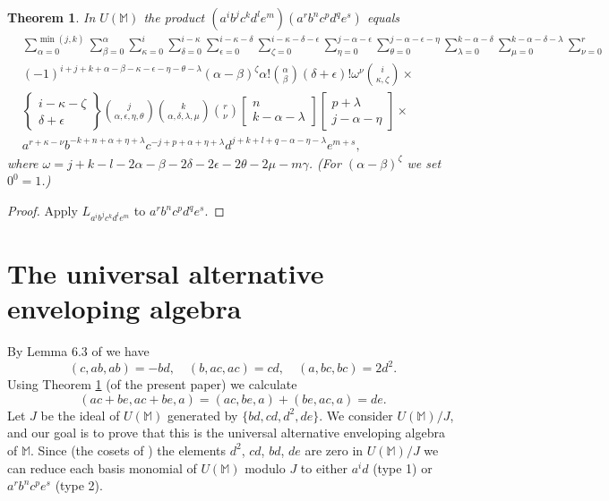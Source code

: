\documentclass{amsart}
\theoremstyle{plain}
\newtheorem{theorem}[lemma]{Theorem}
\theoremstyle{definition}
\begin{document}
\begin{theorem} \label{structureconstants}
In $U(\mathbb{M})$ the product $( a^i b^j c^k d^l e^m) ( a^r b^n c^p d^q e^s)$
equals
  \allowdisplaybreaks
  \begin{align*}
  &
  \sum_{\alpha=0}^{\min(j,k)}
  \sum_{\beta=0}^{\alpha}
  \sum_{\kappa=0}^{i}
  \sum_{\delta=0}^{i-\kappa}
  \sum_{\epsilon=0}^{i-\kappa-\delta}
  \sum_{\zeta=0}^{i{-}\kappa{-}\delta{-}\epsilon}
  \sum_{\eta=0}^{j-\alpha-\epsilon}
  \sum_{\theta=0}^{j-\alpha-\epsilon-\eta}
  \sum_{\lambda=0}^{k-\alpha-\delta}
  \sum_{\mu=0}^{k-\alpha-\delta-\lambda}
  \sum_{\nu=0}^r
  \\
  &
  (-1)^{i+j+k+\alpha-\beta-\kappa-\epsilon-\eta-\theta-\lambda}
  (\alpha{-}\beta)^\zeta
  \alpha!
  \binom{\alpha}{\beta}
  (\delta{+}\epsilon)!
  \omega^\nu
  \binom{i}{\kappa,\zeta}
  \times
  \\
  &
  \left\{ \begin{matrix}
  i{-}\kappa{-}\zeta \\ \delta{+}\epsilon
  \end{matrix} \right\}
  \binom{j}{\alpha,\epsilon,\eta,\theta}
  \binom{k}{\alpha,\delta,\lambda,\mu}
  \binom{r}{\nu}
  \left[
  \begin{matrix}
  n \\
  k{-}\alpha{-}\lambda
  \end{matrix}
  \right]
  \left[
  \begin{matrix}
  p{+}\lambda \\
  j{-}\alpha{-}\eta
  \end{matrix}
  \right]
  \times
  \\
  &
  a^{r+\kappa-\nu}
  b^{-k+n+\alpha+\eta+\lambda}
  c^{-j+p+\alpha+\eta+\lambda}
  d^{j+k+l+q-\alpha-\eta-\lambda} e^{m+s},
  \end{align*}
where $\omega = j {+} k {-} l {-} 2\alpha {-} \beta {-} 2\delta {-} 2\epsilon
{-} 2\theta {-} 2\mu {-} m\gamma$. (For $(\alpha{-}\beta)^\zeta$ we set $0^0 =
1$.)
\end{theorem}

\begin{proof}
Apply $L_{a^i b^j c^k d^l e^m}$ to $a^r b^n c^p d^q e^s$.
\end{proof}


\section{ The universal alternative enveloping algebra}

By Lemma 6.3 of \cite{BHPU} we have
  \[
  (c, ab, ab)= -bd,
  \quad
  (b, ac, ac) = cd,
  \quad
  (a, bc, bc) = 2d^2.
  \]
Using Theorem \ref{structureconstants} (of the present paper) we calculate
  \[
  ( ac+be, ac+be, a ) = ( ac, be, a ) + ( be, ac, a ) = de.
  \]
Let $J$ be the ideal of $U(\mathbb{M})$ generated by $\{ bd, cd, d^2, de \}$.
We consider $U(\mathbb{M})/J$, and our goal is to prove that this is the
universal alternative enveloping algebra of $\mathbb{M}$. Since (the cosets of
) the elements $d^2$, $cd$, $bd$, $de$ are zero in $U(\mathbb{M})/J$ we can
reduce each basis monomial of $U(\mathbb{M})$ modulo $J$ to either $a^i d$
(type 1) or $a^r b^n c^p e^s$ (type 2).
\end{document}
